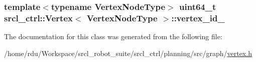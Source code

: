 \hypertarget{classsrcl__ctrl_1_1Vertex_a3603bcc823fb7faf9e6bfa0dcd75d17f}{
\subsubsection[{vertex\-\_\-id\-\_\-}]{\setlength{\rightskip}{0pt plus 5cm}template$<$typename Vertex\-Node\-Type$>$ uint64\-\_\-t {\bf srcl\-\_\-ctrl\-::\-Vertex}$<$ Vertex\-Node\-Type $>$\-::vertex\-\_\-id\-\_\-}}\label{classsrcl__ctrl_1_1Vertex_a3603bcc823fb7faf9e6bfa0dcd75d17f}


The documentation for this class was generated from the following file\-:\begin{DoxyCompactItemize}
\item 
/home/rdu/\-Workspace/srcl\-\_\-robot\-\_\-suite/srcl\-\_\-ctrl/planning/src/graph/\hyperlink{vertex_8h}{vertex.\-h}\end{DoxyCompactItemize}
